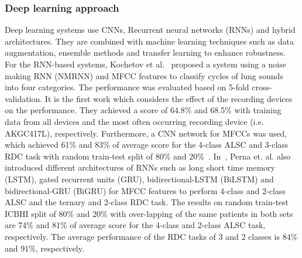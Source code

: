 \documentclass[journal]{IEEEtran}
\begin{document}
\subsubsection{Deep learning approach} 
Deep learning systems use CNNs, Recurrent neural networks (RNNs) and hybrid architectures. They are combined with machine learning techniques such as data augmentation, ensemble methods and transfer learning to enhance robustness. 
For the RNN-based systems, Kochetov et al.~\cite{kochetov2018noise} proposed a system using a noise making RNN (NMRNN) and MFCC features to classify cycles of lung sounds into four categories. The performance was evaluated based on 5-fold cross-validation. It is the first work which considers the effect of the recording devices on the performance. They achieved a score of 64.8\% and 68.5\% with training data from all devices and the most often occurring recording device (i.e. AKGC417L), respectively.
Furthermore, a CNN network for MFCCs was used, which achieved 61\% and 83\% of average score for the 4-class ALSC and 3-class RDC task with random train-test split of 80\% and 20\%~\cite{perna2018convolutional}. In~\cite{dPerna2019lstm}, Perna et. al. also introduced different architectures of RNNs such as long short time memory (LSTM), gated recurrent units (GRU), bidirectional-LSTM (BiLSTM) and bidirectional-GRU (BiGRU) for MFCC features to perform 4-class and 2-class ALSC and the ternary and 2-class RDC task. The results on random train-test ICBHI split of 80\% and 20\% with over-lapping of the same patients in both sets are 74\% and 81\% of average score for the 4-class and 2-class ALSC task, respectively. The average performance of the RDC tasks of 3 and 2 classes is 84\% and 91\%, respectively. 
\end{document}
